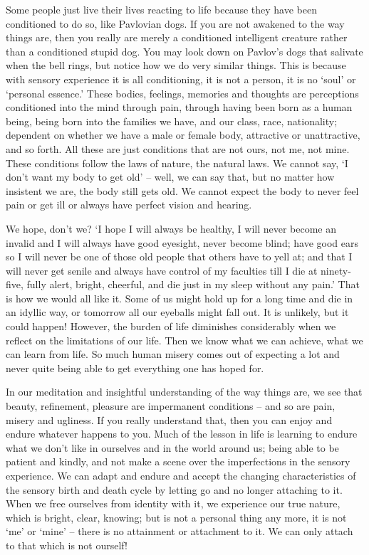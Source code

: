 Some people just live their lives reacting to life because they have been conditioned to do so, like Pavlovian dogs. If you are not awakened to the way things are, then you really are merely a conditioned intelligent creature rather than a conditioned stupid dog. You may look down on Pavlov's dogs that salivate when the bell rings, but notice how we do very similar things. This is because with sensory experience it is all conditioning, it is not a person, it is no `soul' or `personal essence.' These bodies, feelings, memories and thoughts are perceptions conditioned into the mind through pain, through having been born as a human being, being born into the families we have, and our class, race, nationality; dependent on whether we have a male or female body, attractive or unattractive, and so forth. All these are just conditions that are not ours, not me, not mine. These conditions follow the laws of nature, the natural laws. We cannot say, `I don't want my body to get old' -- well, we can say that, but no matter how insistent we are, the body still gets old. We cannot expect the body to never feel pain or get ill or always have perfect vision and hearing.

We hope, don't we? `I hope I will always be healthy, I will never become an invalid and I will always have good eyesight, never become blind; have good ears so I will never be one of those old people that others have to yell at; and that I will never get senile and always have control of my faculties till I die at ninety-five, fully alert, bright, cheerful, and die just in my sleep without any pain.' That is how we would all like it. Some of us might hold up for a long time and die in an idyllic way, or tomorrow all our eyeballs might fall out. It is unlikely, but it could happen! However, the burden of life diminishes considerably when we reflect on the limitations of our life. Then we know what we can achieve, what we can learn from life. So much human misery comes out of expecting a lot and never quite being able to get everything one has hoped for.

In our meditation and insightful understanding of the way things are, we see that beauty, refinement, pleasure are impermanent conditions -- and so are pain, misery and ugliness. If you really understand that, then you can enjoy and endure whatever happens to you. Much of the lesson in life is learning to endure what we don't like in ourselves and in the world around us; being able to be patient and kindly, and not make a scene over the imperfections in the sensory experience. We can adapt and endure and accept the changing characteristics of the sensory birth and death cycle by letting go and no longer attaching to it. When we free ourselves from identity with it, we experience our true nature, which is bright, clear, knowing; but is not a personal thing any more, it is not `me' or `mine' -- there is no attainment or attachment to it. We can only attach to that which is not ourself!


